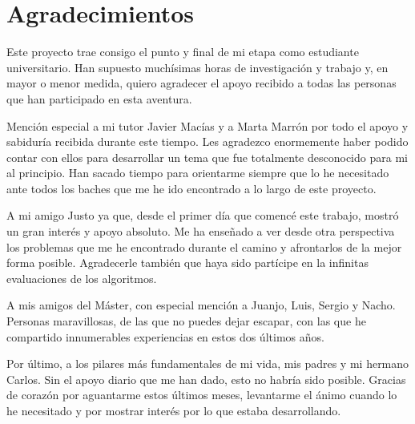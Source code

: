 
\chapter*{Agradecimientos}
\label{cha:agradecimientos}

Este proyecto trae consigo el punto y final de mi etapa como estudiante universitario. Han supuesto muchísimas horas de investigación y trabajo y, en mayor o menor medida, quiero agradecer el apoyo recibido a todas las personas que han participado en esta aventura.

Mención especial a mi tutor Javier Macías y a Marta Marrón por todo el apoyo y sabiduría recibida durante este tiempo. Les agradezco enormemente haber podido contar con ellos para desarrollar un tema que fue totalmente desconocido para mi al principio. Han sacado tiempo para orientarme siempre que lo he necesitado ante todos los baches que me he ido encontrado a lo largo de este proyecto.

A mi amigo Justo ya que, desde el primer día que comencé este trabajo, mostró un gran interés y apoyo absoluto. Me ha enseñado a ver desde otra perspectiva los problemas que me he encontrado durante el camino y afrontarlos de la mejor forma posible. Agradecerle también que haya sido partícipe en la infinitas evaluaciones de los algoritmos.

A mis amigos del Máster, con especial mención a Juanjo, Luis, Sergio y Nacho. Personas maravillosas, de las que no puedes dejar escapar, con las que he compartido innumerables experiencias en estos dos últimos años.

Por último, a los pilares más fundamentales de mi vida, mis padres y mi hermano Carlos. Sin el apoyo diario que me han dado, esto no habría sido posible. Gracias de corazón por aguantarme estos últimos meses, levantarme el ánimo cuando lo he necesitado y por mostrar interés por lo que estaba desarrollando. 